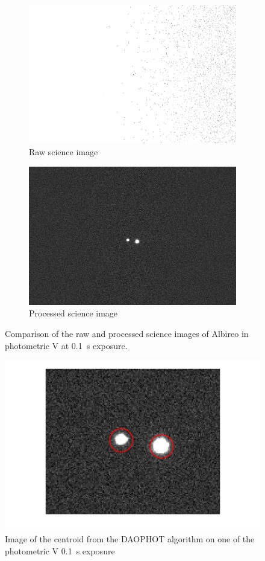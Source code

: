 \documentclass[%
aip,
jmp,
reprint,
floatfix,
nobibfootnote,
]{revtex4-1}
\begin{document}
	\begin{figure}[]
		\begin{subfigure}{\linewidth}
			\centering
			\includegraphics[width=.8\linewidth]{figs/pre.png}
			\caption{Raw science image}
		\end{subfigure}
		\begin{subfigure}{\linewidth}
			\centering
			\includegraphics[width=.8\linewidth]{figs/post.png}
			\caption{Processed science image}
		\end{subfigure}
		\caption{Comparison of the raw and processed science images of Albireo in photometric V at \SI{0.1}{\second} exposure.}
		\label{fig:comparison}
	\end{figure}

	\begin{figure}
		\centering
		\includegraphics[width=\linewidth]{figs/dao.png}
		\caption{Image of the centroid from the DAOPHOT algorithm on one of the photometric V \SI{0.1}{\second} exposure}
		\label{fig:centroids}
	\end{figure}
\end{document}
